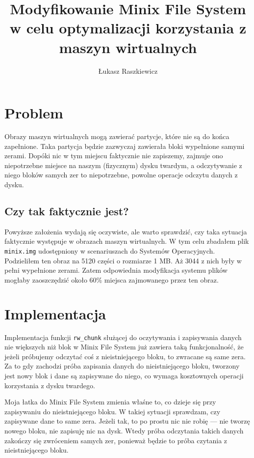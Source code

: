 \documentclass{sig-alternate-05-2015}
\begin{document}
\title{Modyfikowanie Minix File System w celu optymalizacji korzystania z maszyn wirtualnych}

\author{
    \alignauthor
    Łukasz Raszkiewicz\\
}

\maketitle


\section{Problem}
Obrazy maszyn wirtualnych mogą zawierać partycje, które nie są do końca zapełnione.
Taka partycja będzie zazwyczaj zawierała bloki wypełnione samymi zerami.
Dopóki nic w tym miejscu faktycznie nie zapiszemy, zajmuje ono niepotrzebne miejsce na naszym (fizycznym) dysku twardym, a odczytywanie z niego bloków samych zer to niepotrzebne, powolne operacje odczytu danych z dysku.

\subsection{Czy tak faktycznie jest?}
Powyższe założenia wydają się oczywiste, ale warto sprawdzić, czy taka sytuacja faktycznie występuje w obrazach maszyn wirtualnych.
W tym celu zbadałem plik \texttt{minix.img} udostępniony w scenariuszach do Systemów Operacyjnych.
Podzieliłem ten obraz na 5120 części o rozmiarze 1 MB. Aż 3044 z nich były w pełni wypełnione zerami.
Zatem odpowiednia modyfikacja systemu plików mogłaby zaoszczędzić około 60\% miejsca zajmowanego przez ten obraz.


\section{Implementacja}
Implementacja funkcji \texttt{rw\_chunk} służącej do oczytywania i zapisywania danych nie większych niż blok w Minix File System już zawiera taką funkcjonalność, że jeżeli próbujemy odczytać coś z nieistniejącego bloku, to zwracane są same zera.
Za to gdy zachodzi próba zapisania danych do nieistniejącego bloku, tworzony jest nowy blok i dane są zapisywane do niego, co wymaga kosztownych operacji korzystania z dysku twardego.\par

Moja łatka do Minix File System zmienia właśne to, co dzieje się przy zapisywaniu do nieistniejącego bloku.
W takiej sytuacji sprawdzam, czy zapisywane dane to same zera.
Jeżeli tak, to po prostu nic nie robię --- nie tworzę nowego bloku, nie zapisuję nic na dysk.
Wtedy próba odczytania takich danych zakończy się zwróceniem samych zer, ponieważ będzie to próba czytania z nieistniejącego bloku.\par
\end{document}
